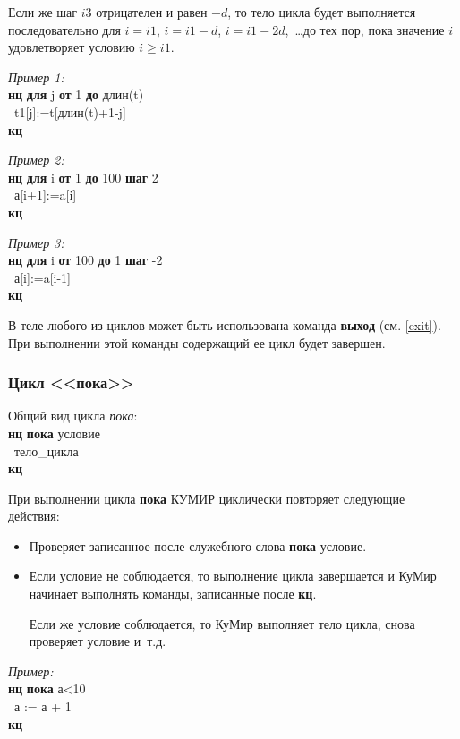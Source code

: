 \documentclass[12pt,a4paper]{article}
\newcommand{\otstup}{\textperiodcentered\ }
\begin{document}
Если же шаг $i3$ отрицателен и равен $-d$, то тело цикла будет выполняется последовательно для $i=i1$, $i=i1-d$, $i=i1-2d$,~\dots до тех пор, пока значение $i$ удовлетворяет условию $i \ge i1$.

\emph{Пример 1:}\\
{\sffamily
\textbf{нц} \textbf{для} j \textbf{от} 1 \textbf{до} длин(t)\\
\otstup t1[j]:=t[длин(t)+1-j]\\
\textbf{кц}
}

\emph{Пример 2:}\\
{\sffamily
\textbf{нц} \textbf{для} i \textbf{от} 1 \textbf{до} 100 \textbf{шаг} 2\\
\otstup а[i+1]:=a[i]\\
\textbf{кц}
}

\emph{Пример 3:}\\
{\sffamily
\textbf{нц} \textbf{для} i \textbf{от} 100 \textbf{до} 1 \textbf{шаг} -2\\
\otstup а[i]:=a[i-1]\\
\textbf{кц}
}

	В теле любого из циклов может быть использована команда \textbf{выход} (см. \ref{exit}). При выполнении этой команды содержащий ее цикл будет завершен.

\subsubsection[Цикл ''пока'']{Цикл <<пока>>}

Общий вид цикла \emph{пока}:\\
{\sffamily
\textbf{нц} \textbf{пока} условие\\
\otstup тело\_цикла\\
\textbf{кц}
}

При выполнении цикла \textbf{пока} КУМИР циклически повторяет следующие действия:
\begin{itemize}
\item Проверяет записанное после служебного слова \textbf{пока} условие.
\item Если условие не соблюдается, то выполнение цикла завершается и КуМир начинает выполнять команды, записанные после \textbf{кц}.

Если же условие соблюдается, то КуМир выполняет тело цикла, снова проверяет условие и~т.д.
\end{itemize}

\emph{Пример:}\\
{\sffamily
\textbf{нц} \textbf{пока} а<10\\
\otstup а := а + 1\\
\textbf{кц}
}
\end{document}
